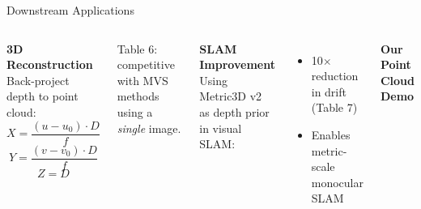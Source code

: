 \begin{frame}{Downstream Applications}
\begin{columns}[T]
\textbf{3D Reconstruction}\\[4pt]
Back-project depth to point cloud:
\[
  X = \frac{(u - u_0) \cdot D}{f}
\]
\[
  Y = \frac{(v - v_0) \cdot D}{f}
\]
\[
  Z = D
\]

Table 6: competitive with MVS methods using a \textit{single} image.

\textbf{SLAM Improvement}\\[4pt]
Using Metric3D v2 as depth prior in visual SLAM:
\begin{itemize}
  \item 10$\times$ reduction in drift (Table 7)
  \item Enables metric-scale monocular SLAM
\end{itemize}

\textbf{Our Point Cloud Demo}\\[4pt]
\end{columns}
\end{frame}
